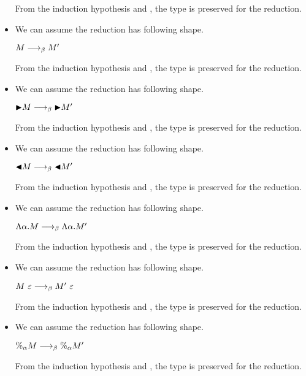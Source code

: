 \begin{itemize}
	      From the induction hypothesis and \TAbs, the type is preserved for the reduction.


	\item \TConv

	      We can assume the reduction has following shape.

	      $M \longrightarrow_{\beta} M'$

	      From the induction hypothesis and \TConv, the type is preserved for the reduction.

	\item \TTB

	      We can assume the reduction has following shape.

	      ${\mathop{\blacktriangleright}} M \longrightarrow_{\beta} {\mathop{\blacktriangleright}} M'$

	      From the induction hypothesis and \TTB, the type is preserved for the reduction.

	\item \TTBL

	      We can assume the reduction has following shape.

	      ${\mathop{\blacktriangleleft}} M \longrightarrow_{\beta} {\mathop{\blacktriangleleft}} M'$

	      From the induction hypothesis and \TTBL, the type is preserved for the reduction.

	\item \TGen

	      We can assume the reduction has following shape.

	      $\Lambda\alpha. M \longrightarrow_{\beta} \Lambda\alpha. M'$

	      From the induction hypothesis and \TGen, the type is preserved for the reduction.

	\item \TIns

	      We can assume the reduction has following shape.

	      $M\ \varepsilon \longrightarrow_{\beta} M'\ \varepsilon$

	      From the induction hypothesis and \TIns, the type is preserved for the reduction.

	\item \TCsp

	      We can assume the reduction has following shape.

	      $\%_\alpha M \longrightarrow_{\beta} \%_\alpha M'$

	      From the induction hypothesis and \TCsp, the type is preserved for the reduction.

	      \fi

\end{itemize}

